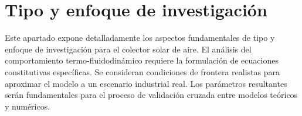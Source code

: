 \section{Tipo y enfoque de investigación}
\label{sec:cap04_tipo_enfoque}

Este apartado expone detalladamente los aspectos fundamentales de tipo y enfoque de investigación para el colector solar de aire.
El análisis del comportamiento termo-fluidodinámico requiere la formulación de ecuaciones constitutivas específicas.
Se consideran condiciones de frontera realistas para aproximar el modelo a un escenario industrial real.
Los parámetros resultantes serán fundamentales para el proceso de validación cruzada entre modelos teóricos y numéricos.
